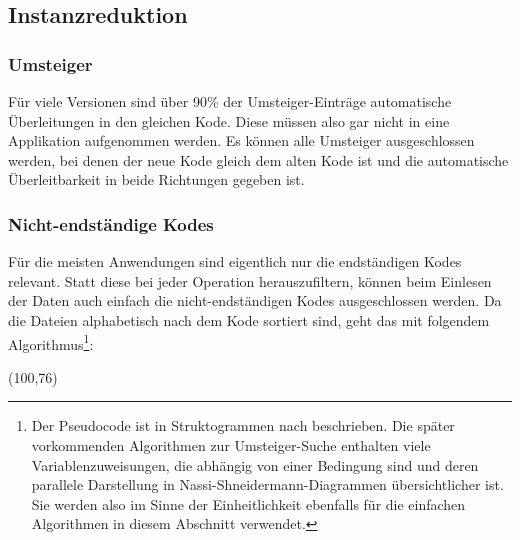 \subsection{Instanzreduktion}
 
\subsubsection{Umsteiger}

Für viele Versionen sind über 90\% der Umsteiger-Einträge automatische Überleitungen in den gleichen Kode. Diese müssen also gar nicht in eine Applikation aufgenommen werden. Es können alle Umsteiger ausgeschlossen werden, bei denen der neue Kode gleich dem alten Kode ist und die automatische Überleitbarkeit in beide Richtungen gegeben ist. 

\subsubsection{Nicht-endständige Kodes}

Für die meisten Anwendungen sind eigentlich nur die endständigen Kodes relevant. Statt diese bei jeder Operation herauszufiltern, können beim Einlesen der Daten auch einfach die nicht-endständigen Kodes ausgeschlossen werden. Da die Dateien alphabetisch nach dem Kode sortiert sind, geht das mit folgendem Algorithmus\footnote{Der Pseudocode ist in Struktogrammen nach \citep{nassishneid} beschrieben. Die später vorkommenden Algorithmen zur Umsteiger-Suche enthalten viele Variablenzuweisungen, die abhängig von einer Bedingung sind und deren parallele Darstellung in Nassi-Shneidermann-Diagrammen übersichtlicher ist. Sie werden also im Sinne der Einheitlichkeit ebenfalls für die einfachen Algorithmen in diesem Abschnitt verwendet.}:

\begin{struktogramm}(100,76)
    \change
    \ifend
    \whileend
\end{struktogramm}

